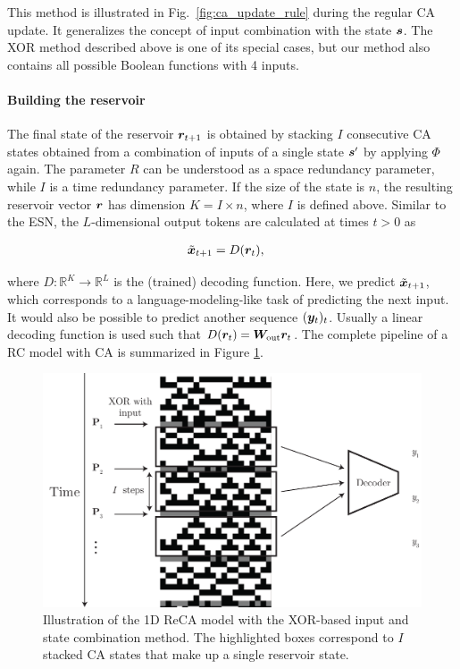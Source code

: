 This method is illustrated in Fig.~\ref{fig:ca_update_rule} during the regular CA
update. It generalizes the concept of input combination with the state ${\bm{s}}$.
The XOR method described above is one of its special cases, but our method also
contains all possible Boolean functions with 4 inputs.

\paragraph{Building the reservoir}
The final state of the reservoir ${\bm{r}}_{t + 1}$ is obtained by stacking $I$ consecutive
CA states obtained from a combination of inputs of a single state ${\bm{s}}'$ by applying $\Phi$
again. The parameter $R$ can be understood as a space redundancy parameter,
while $I$ is a time redundancy parameter. If the size of the state is $n$, the
resulting reservoir vector ${\bm{r}}$ has dimension $K = I \times n$, where $I$ is
defined above. Similar to the \ac{ESN}, the $L$-dimensional output tokens are
calculated at times $t > 0$ as

\begin{equation}
  \begin{aligned}
    \tilde{{\bm{x}}}_{t+ 1} & = D({\bm{r}}_{t}),
  \end{aligned}
\end{equation}

where $D: \mathbb{R}^{K} \rightarrow \mathbb{R}^{L}$ is the (trained) decoding function. Here, we predict
$\tilde{{\bm{x}}}_{t+1}$, which corresponds to a language-modeling-like task of
predicting the next input. It would also be possible to predict another sequence
$({\bm{y}}_{t})_{t}$. Usually a linear decoding function is used such that
$D({\bm{r}}_{t}) = {\bm{W}}_{\text{out}}{\bm{r}}_{t}$. The complete pipeline of a \ac{RC} model
with \ac{CA} is summarized in Figure \ref{fig:reca-schema}.

\begin{figure}[htbp]
  \centering
  \includegraphics[width=.6\linewidth]{figures/reca_schema.pdf}
  \caption{Illustration of the 1D ReCA model with the XOR-based input and
    state combination method. The highlighted boxes correspond to $I$ stacked \ac{CA} 
    states that make up a single reservoir state.}\label{fig:reca-schema}
\end{figure}
